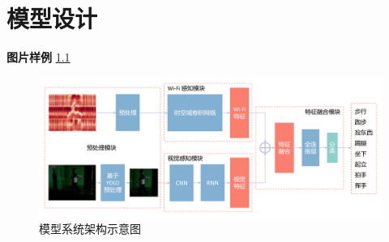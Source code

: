 
\chapter{模型设计}
\label{chap03}
\linespread{1.25}
\sloppy{}

\textbf{图片样例} \ref{ViFi_system}

\begin{figure}[htbp]
	\centering
	\includegraphics[scale = 0.165]{figures/system.png}
	\caption{\song\wuhao 模型系统架构示意图}
	\label{ViFi_system}
\end{figure}